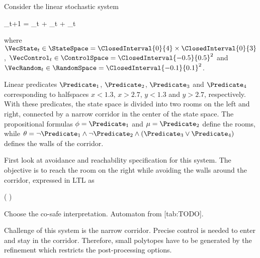 Consider the linear stochastic system

\startformula
    \VecX_{t+1} =  \VecState_{t} +  \VecControl_{t} + \VecRandom_{t} \EndComma
\stopformula

where $\VecState_{t} \in \StateSpace = \ClosedInterval{0}{4} \times \ClosedInterval{0}{3}$, $\VecControl_{t} \in \ControlSpace = \ClosedInterval{-0.5}{0.5}^2$ and $\VecRandom_{t} \in \RandomSpace = \ClosedInterval{-0.1}{0.1}^2$.

Linear predicates $\Predicate_1$, $\Predicate_2$, $\Predicate_3$ and $\Predicate_4$ corresponding to halfspaces $x < 1.3$, $x > 2.7$, $y < 1.3$ and $y > 2.7$, respectively.
With these predicates, the state space is divided into two rooms on the left and right, connected by a narrow corridor in the center of the state space.
The propositional formulas $\phi = \Predicate_1$ and $\mu = \Predicate_2$ define the rooms, while $\theta = \neg \Predicate_1 \wedge \neg \Predicate_2 \wedge (\Predicate_3 \vee \Predicate_4)$ defines the walls of the corridor.

\startsubsection[title={Reachability Analysis},reference=sec:cases-corridor-reachability]


    First look at avoidance and reachability specification for this system.
    The objective is to reach the room on the right while avoiding the walls around the corridor, expressed in LTL as

    \startformula
        ( \neg \theta ) \,\Until\, \phi \EndPeriod
    \stopformula

    Choose the co-safe interpretation.
    Automaton from [tab:TODO].

    Challenge of this system is the narrow corridor.
    Precise control is needed to enter and stay in the corridor.
    Therefore, small polytopes have to be generated by the refinement which restricts the post-processing options.

